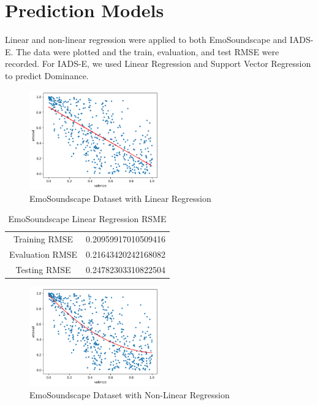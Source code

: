 \documentclass[conference]{IEEEtran}
\begin{document}
{%
\section{Prediction Models}
\label{sec:models}

\noindent
Linear and non-linear regression were applied to both EmoSoundscape and IADS-E. The data were plotted and the train, evaluation, and test RMSE were recorded. For IADS-E, we used Linear Regression and Support Vector Regression to predict Dominance.\\

\begin{figure}[h]
\caption{EmoSoundscape Dataset with Linear Regression}
\centering
\includegraphics[width=0.5\textwidth]{Figures/emosound_lin.png}
\end{figure}

\begin{table}[h]
\caption{EmoSoundscape Linear Regression RSME}
\begin{center}
\begin{tabular}{ |c|c| } 
 \hline
 Training RMSE & 0.20959917010509416 \\ 
 Evaluation RMSE & 0.21643420242168082 \\ 
 Testing RMSE & 0.24782303310822504 \\ 
 \hline
\end{tabular}
\end{center}
\label{tab:myTab}
\end{table}

\FloatBarrier

\begin{figure}[h]
\caption{EmoSoundscape Dataset with Non-Linear Regression}
\centering
\includegraphics[width=0.5\textwidth]{Figures/emosound_nonlin.png}
\end{figure}

}
\end{document}
